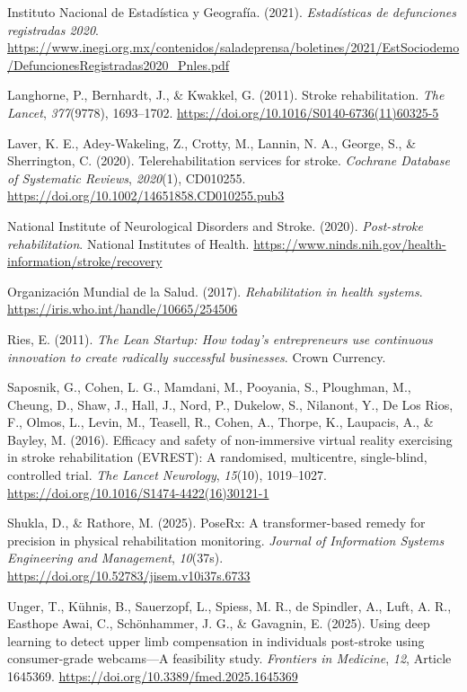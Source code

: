 \documentclass[11pt,a4paper]{article}
\begin{document}
\noindent Instituto Nacional de Estadística y Geografía. (2021). \textit{Estadísticas de defunciones registradas 2020}. \url{https://www.inegi.org.mx/contenidos/saladeprensa/boletines/2021/EstSociodemo/DefuncionesRegistradas2020_Pnles.pdf}

\noindent Langhorne, P., Bernhardt, J., \& Kwakkel, G. (2011). Stroke rehabilitation. \textit{The Lancet}, \textit{377}(9778), 1693--1702. \url{https://doi.org/10.1016/S0140-6736(11)60325-5}

\noindent Laver, K. E., Adey-Wakeling, Z., Crotty, M., Lannin, N. A., George, S., \& Sherrington, C. (2020). Telerehabilitation services for stroke. \textit{Cochrane Database of Systematic Reviews}, \textit{2020}(1), CD010255. \url{https://doi.org/10.1002/14651858.CD010255.pub3}

\noindent National Institute of Neurological Disorders and Stroke. (2020). \textit{Post-stroke rehabilitation}. National Institutes of Health. \url{https://www.ninds.nih.gov/health-information/stroke/recovery}

\noindent Organización Mundial de la Salud. (2017). \textit{Rehabilitation in health systems}. \url{https://iris.who.int/handle/10665/254506}

\noindent Ries, E. (2011). \textit{The Lean Startup: How today's entrepreneurs use continuous innovation to create radically successful businesses}. Crown Currency.

\noindent Saposnik, G., Cohen, L. G., Mamdani, M., Pooyania, S., Ploughman, M., Cheung, D., Shaw, J., Hall, J., Nord, P., Dukelow, S., Nilanont, Y., De Los Rios, F., Olmos, L., Levin, M., Teasell, R., Cohen, A., Thorpe, K., Laupacis, A., \& Bayley, M. (2016). Efficacy and safety of non-immersive virtual reality exercising in stroke rehabilitation (EVREST): A randomised, multicentre, single-blind, controlled trial. \textit{The Lancet Neurology}, \textit{15}(10), 1019--1027. \url{https://doi.org/10.1016/S1474-4422(16)30121-1}

\noindent Shukla, D., \& Rathore, M. (2025). PoseRx: A transformer-based remedy for precision in physical rehabilitation monitoring. \textit{Journal of Information Systems Engineering and Management}, \textit{10}(37s). \url{https://doi.org/10.52783/jisem.v10i37s.6733}

\noindent Unger, T., K\"uhnis, B., Sauerzopf, L., Spiess, M. R., de Spindler, A., Luft, A. R., Easthope Awai, C., Sch\"onhammer, J. G., \& Gavagnin, E. (2025). Using deep learning to detect upper limb compensation in individuals post-stroke using consumer-grade webcams---A feasibility study. \textit{Frontiers in Medicine}, \textit{12}, Article 1645369. \url{https://doi.org/10.3389/fmed.2025.1645369}
\end{document}

